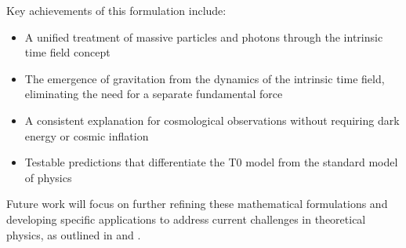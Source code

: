 \documentclass[12pt,a4paper]{article}
\theoremstyle{definition}
\theoremstyle{remark}
\begin{document}
	Key achievements of this formulation include:
	\begin{itemize}
		\item A unified treatment of massive particles and photons through the intrinsic time field concept
		\item The emergence of gravitation from the dynamics of the intrinsic time field, eliminating the need for a separate fundamental force
		\item A consistent explanation for cosmological observations without requiring dark energy or cosmic inflation
		\item Testable predictions that differentiate the T0 model from the standard model of physics
	\end{itemize}
	
	Future work will focus on further refining these mathematical formulations and developing specific applications to address current challenges in theoretical physics, as outlined in \cite{pascher_galaxies_2025} and \cite{pascher_feldtheorie_2025}.
	
\end{document}
